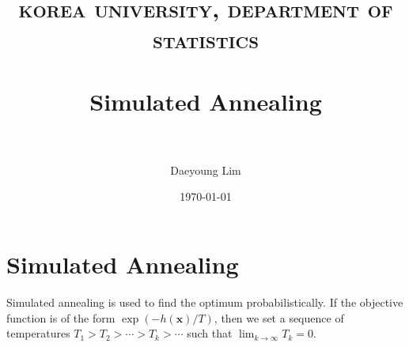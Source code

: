 \documentclass{article}
\title{ 
\normalfont \normalsize 
\textsc{korea university, department of statistics} \\ [25pt] %
\horrule{0.5pt} \\[0.4cm] %
\huge Simulated Annealing \\ %
\horrule{2pt} \\[0.5cm] %
}
\author{Daeyoung Lim} %
\date{\normalsize\today} %
\numberwithin{equation}{section} %
\numberwithin{figure}{section} %
\numberwithin{table}{section} %
\begin{document}
\maketitle
\section{Simulated Annealing}
Simulated annealing is used to find the optimum probabilistically. If the objective function is of the form $\exp\left(-h(\mathbf{x})/T\right)$, then we set a sequence of temperatures $T_{1}>T_{2}>\cdots > T_{k}>\cdots$ such that $\lim_{k\to\infty}T_{k}=0$.

\newpage
\nocite{*}


\end{document}
